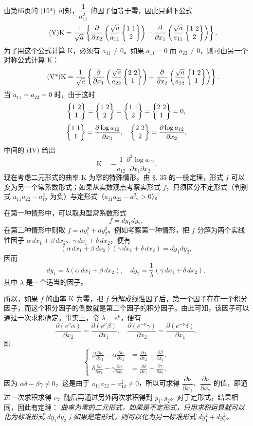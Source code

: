 由第65页的 (19*) 可知，$\dfrac{1}{a_{11}^2}$ 的因子恒等于零，因此只剩下公式
\begin{equation}\tag{V}
\mathrm K=\frac{1}{\sqrt a}\left\{\frac{\partial}{\partial x_2}\left(\frac{\sqrt a}{a_{11}}\left\{\begin{matrix}1\ 1\\ 2\end{matrix}\right\}\right)-\frac{\partial}{\partial x_1}\left(\frac{\sqrt a}{a_{11}}\left\{\begin{matrix}1\ 2\\ 2\end{matrix}\right\}\right)\right\}.
\end{equation}
为了用这个公式计算 $\mathrm K$，必须有 $a_{11}\ne0$。如果 $a_{11}=0$ 而 $a_{22}\ne0$，则可由另一个对称公式计算 $\mathrm K$：
\begin{equation}\tag{V*}
\mathrm K=\frac{1}{\sqrt a}\left\{\frac{\partial}{\partial x_1}\left(\frac{\sqrt a}{a_{22}}\left\{\begin{matrix}2\ 2\\ 1\end{matrix}\right\}\right)-\frac{\partial}{\partial x_2}\left(\frac{\sqrt a}{a_{22}}\left\{\begin{matrix}1\ 2\\ 1\end{matrix}\right\}\right)\right\}.
\end{equation}
当 $a_{11}=a_{22}=0$ 时，由于这时
\[
\left\{\begin{matrix}1\ 2\\ 1\end{matrix}\right\}=\left\{\begin{matrix}1\ 2\\ 2\end{matrix}\right\}=\left\{\begin{matrix}1\ 1\\ 2\end{matrix}\right\}=\left\{\begin{matrix}2\ 2\\ 1\end{matrix}\right\}=0,
\]
\[
\left\{\begin{matrix}1\ 1\\ 1\end{matrix}\right\}=\frac{\partial\log a_{12}}{\partial x_1},\quad
\left\{\begin{matrix}2\ 2\\ 2\end{matrix}\right\}=\frac{\partial\log a_{12}}{\partial x_2},
\]
中间的 (IV) 给出
\begin{equation}\tag{VI}
\mathrm K=-\frac{1}{a_{12}}\frac{\partial^2\log a_{12}}{\partial x_1\partial x_2}.
\end{equation}
现在考虑二元形式的曲率 $\mathrm K$ 为零的特殊情形。由 §. 35 的一般定理，形式 $f$ 可以变为另一个常系数形式；如果从实数观点考察实形式 $f$，只须区分不定形式（判别式 $a_{11}a_{22}-a_{12}^2$ 为负）与定形式（$a_{11}a_{22}-a_{12}^2>0$）。

在第一种情形中，可以取典型常系数形式
\[
f=dy_1dy_2,
\]
在第二种情形中则取 $f=dy_1^2+dy_2^2$。例如考察第一种情形，把 $f$ 分解为两个实线性因子 $\alpha\,dx_1+\beta\,dx_2$、$\gamma\,dx_1+\delta\,dx_2$，便有
\[
(\alpha\,dx_1+\beta\,dx_2)(\gamma\,dx_1+\delta\,dx_2)=dy_1dy_2,
\]
因而
\[
dy_1=\lambda(\alpha\,dx_1+\beta\,dx_2),\quad dy_2=\frac{1}{\lambda}(\gamma\,dx_1+\delta\,dx_2),
\]
其中 $\lambda$ 是一个适当的因子。

所以，如果 $f$ 的曲率 $\mathrm K$ 为零，把 $f$ 分解成线性因子后，第一个因子存在一个积分因子，而这个积分因子的倒数就是第二个因子的积分因子。由此可知，该因子可以通过一次求积确定。事实上，令 $\lambda=e^\nu$，便有
\[
\frac{\partial(e^\nu\alpha)}{\partial x_2}=\frac{\partial(e^\nu\beta)}{\partial x_1},\quad
\frac{\partial(e^{-\nu}\gamma)}{\partial x_2}=\frac{\partial(e^{-\nu}\delta)}{\partial x_1},
\]
即
\[
\left\{
\begin{aligned}
\beta\frac{\partial\nu}{\partial x_1}-\alpha\frac{\partial\nu}{\partial x_2}&=\frac{\partial\alpha}{\partial x_2}-\frac{\partial\beta}{\partial x_1},\\
\delta\frac{\partial\nu}{\partial x_1}-\gamma\frac{\partial\nu}{\partial x_2}&=\frac{\partial\delta}{\partial x_1}-\frac{\partial\gamma}{\partial x_2},
\end{aligned}
\right.
\]
因为 $\alpha\delta-\beta\gamma\ne0$，这是由于 $a_{11}a_{22}-a_{12}^2\ne0$，所以可求得 $\dfrac{\partial\nu}{\partial x_1}$、$\dfrac{\partial\nu}{\partial x_2}$ 的值，即通过一次求积求得 $\nu$，随后再通过另外两次求积得到 $y_1,y_2$。对于定形式，结果相同，因此有定理：
\emph{曲率为零的二元形式，如果是不定形式，只用求积运算就可以化为标准形式 $dy_1dy_2$；如果是定形式，则可以化为另一标准形式 $dy_1^2+dy_2^2$。}


